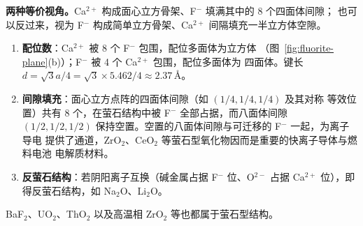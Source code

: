 \textbf{两种等价视角。}Ca$^{2+}$ 构成面心立方骨架、F$^-$ 填满其中的 8 个四面体间隙；
也可以反过来，视为 F$^-$ 构成简单立方骨架、Ca$^{2+}$ 间隔填充一半立方体空隙。

\begin{enumerate}[label=（\arabic*）]
  \item \textbf{配位数}：Ca$^{2+}$ 被 8 个 F$^-$ 包围，配位多面体为立方体
    （图~\ref{fig:fluorite-plane}(b)）；F$^-$ 被 4 个 Ca$^{2+}$ 包围，配位多面体为
    四面体。键长 $d=\sqrt{3}a/4=\sqrt{3}\times5.462/4\approx2.37$\,\AA。
  \item \textbf{间隙填充}：面心立方点阵的四面体间隙（如 $(1/4,1/4,1/4)$ 及其对称
    等效位置）共有 8 个，在萤石结构中被 F$^-$ 全部占据，而八面体间隙
    $(1/2,1/2,1/2)$ 保持空置。空置的八面体间隙与可迁移的 F$^-$ 一起，为离子导电
    提供了通道，ZrO$_2$、CeO$_2$ 等萤石型氧化物因而是重要的快离子导体与燃料电池
    电解质材料。
  \item \textbf{反萤石结构}：若阴阳离子互换（碱金属占据 F$^-$ 位、O$^{2-}$ 占据
    Ca$^{2+}$ 位），即得反萤石结构，如 Na$_2$O、Li$_2$O。
\end{enumerate}

BaF$_2$、UO$_2$、ThO$_2$ 以及高温相 ZrO$_2$ 等也都属于萤石型结构。
